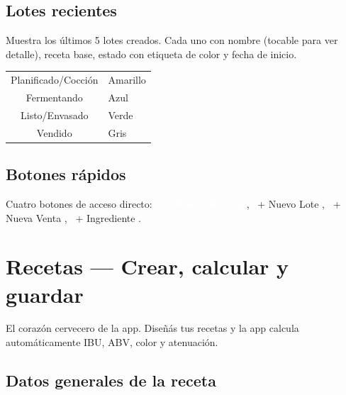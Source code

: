 \documentclass[11pt,a4paper]{report}
\newcommand{\appbtn}[1]{%
  \textcolor{white}{\colorbox{beer}{\footnotesize\sffamily\bfseries\ #1}}%
}
\newcommand{\appbtnsec}[1]{%
  \colorbox{black!10}{\footnotesize\sffamily\ #1}%
}
\begin{document}
\section{Lotes recientes}

Muestra los últimos 5 lotes creados. Cada uno con nombre (tocable para ver detalle), receta base, estado con etiqueta de color y fecha de inicio.

\begin{center}
\begin{tabular}{cl}
\toprule
\colorbox{yellow!30}{Planificado/Cocción} & Amarillo \\
\colorbox{blue!20}{Fermentando} & Azul \\
\colorbox{green!20}{Listo/Envasado} & Verde \\
\colorbox{gray!20}{Vendido} & Gris \\
\bottomrule
\end{tabular}
\end{center}

\section{Botones rápidos}

Cuatro botones de acceso directo:
\appbtn{+ Nueva Receta},
\appbtnsec{+ Nuevo Lote},
\appbtnsec{+ Nueva Venta},
\appbtnsec{+ Ingrediente}.

\chapter{Recetas — Crear, calcular y guardar}

El corazón cervecero de la app. Diseñás tus recetas y la app calcula automáticamente IBU, ABV, color y atenuación.

\section{Datos generales de la receta}
\end{document}
